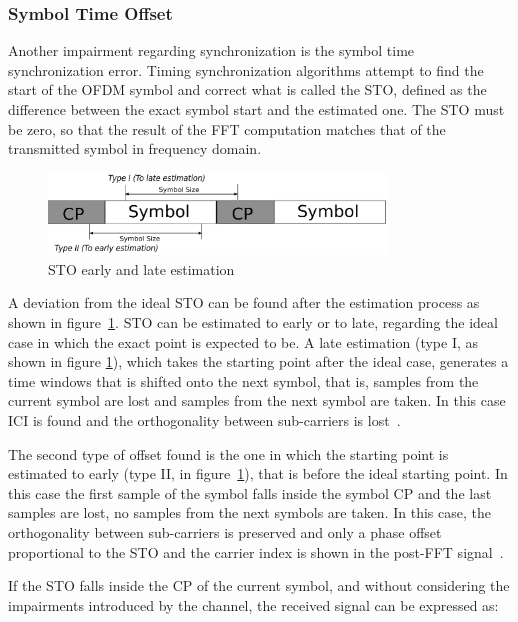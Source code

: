  \subsubsection{Symbol Time Offset}
\label{sec:symbol_time_offset}

  Another impairment regarding synchronization is the symbol time synchronization error. Timing synchronization algorithms attempt to find the start of the OFDM symbol and correct what is called the STO, defined as the difference between the exact symbol start and the estimated one. The STO must be zero, so that the result of the FFT computation matches that of the transmitted symbol in frequency domain. 
  
  
  \begin{figure}[!hbt]
  \centering
    \includegraphics[width=0.8\textwidth]
      {./figures/STO_symbol}
  \caption{STO early and late estimation}
  \label{fig:sto_estimation}
\end{figure}


 A deviation from the ideal STO can be found after the estimation process as shown in figure~\ref{fig:sto_estimation}. STO can be estimated to early or to late, regarding the ideal case in which the exact point is expected to be. A late estimation (type I, as shown in figure \ref{fig:sto_estimation}), which takes the starting point after the ideal case, generates a time windows that is shifted onto the next symbol, that is, samples from the current symbol are lost and samples from the next symbol are taken. In this case ICI is found and the orthogonality between sub-carriers is lost~\cite{cho2010mimo}. 


  The second type of offset found is the one in which the starting point is estimated to early (type II, in figure~\ref{fig:sto_estimation}), that is before the ideal starting point. In this case the first sample of the symbol falls inside the symbol CP and the last samples are lost, no samples from the next symbols are taken. In this case, the orthogonality between sub-carriers is preserved and only a phase offset proportional to the STO and the carrier index is shown in the post-FFT signal~\cite{cho2010mimo}.
  
If the STO falls inside the CP of the current symbol, and without considering the impairments introduced by the channel, the received signal can be expressed as:


